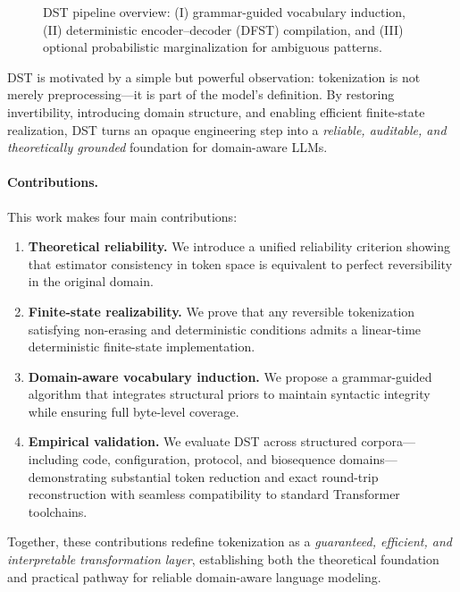 \begin{figure}[t]
  \centering
  \setlength{\fboxsep}{0pt}\fbox{\rule{0pt}{120pt}\rule{240pt}{0pt}}
  \caption{DST pipeline overview: (I) grammar-guided vocabulary induction, (II) deterministic encoder–decoder (DFST) compilation, and (III) optional probabilistic marginalization for ambiguous patterns.}
  \label{fig:dst_pipeline}
\end{figure}

DST is motivated by a simple but powerful observation: tokenization is not merely preprocessing—it is part of the model’s definition.
By restoring invertibility, introducing domain structure, and enabling efficient finite-state realization, DST turns an opaque engineering step into a \emph{reliable, auditable, and theoretically grounded} foundation for domain-aware LLMs.

\paragraph{Contributions.}
This work makes four main contributions:

\begin{enumerate}
  \item \textbf{Theoretical reliability.}
  We introduce a unified reliability criterion showing that estimator consistency in token space is equivalent to perfect reversibility in the original domain.

  \item \textbf{Finite-state realizability.}
  We prove that any reversible tokenization satisfying non-erasing and deterministic conditions admits a linear-time deterministic finite-state implementation.

  \item \textbf{Domain-aware vocabulary induction.}
  We propose a grammar-guided algorithm that integrates structural priors to maintain syntactic integrity while ensuring full byte-level coverage.

  \item \textbf{Empirical validation.}
  We evaluate DST across structured corpora—including code, configuration, protocol, and biosequence domains—demonstrating substantial token reduction and exact round-trip reconstruction with seamless compatibility to standard Transformer toolchains.
\end{enumerate}

Together, these contributions redefine tokenization as a \emph{guaranteed, efficient, and interpretable transformation layer}, establishing both the theoretical foundation and practical pathway for reliable domain-aware language modeling.
